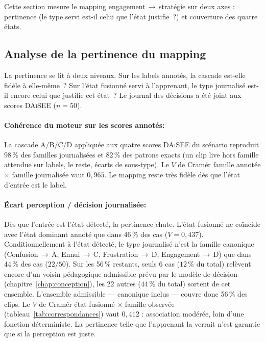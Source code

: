 Cette section mesure le mapping
engagement\,$\rightarrow$\,stratégie sur deux axes : pertinence (le type servi est-il celui que l'état justifie~?) et
couverture des quatre états.

\subsection{Analyse de la pertinence du mapping}
\label{subsec:val-correspondances}

La pertinence se lit à deux niveaux. Sur les labels annotés, la
cascade est-elle fidèle à elle-même~? Sur l'état fusionné servi
à l'apprenant, le type journalisé est-il encore celui que justifie cet
état~? Le journal des décisions a été joint aux scores
\textsc{DAiSEE} ($n=50$).

\paragraph{Cohérence du moteur sur les scores annotés:}
La cascade A/B/C/D appliquée aux quatre scores \textsc{DAiSEE} du
scénario reproduit 98\,\% des familles journalisées et
82\,\% des patrons exacts (un clip live hors famille attendue
sur labels, le reste, écarts de sous-type). Le $V$ de Cramér famille
annotée $\times$ famille journalisée vaut $0{,}965$. Le mapping reste
très fidèle dès que l'état d'entrée est le label.

\paragraph{Écart perception / décision journalisée:}
Dès que l'entrée est l'état détecté, la pertinence chute. L'état
fusionné ne coïncide avec l'état dominant annoté que dans
46\,\% des cas ($V=0{,}437$). Conditionnellement à l'état
détecté, le type journalisé n'est la famille canonique
(Confusion\,$\rightarrow$\,A, Ennui\,$\rightarrow$\,C,
Frustration\,$\rightarrow$\,D, Engagement\,$\rightarrow$\,D) que dans
44\,\% des cas ($22/50$). Sur les 56\,\%
restants, seuls 6 cas ($12\,\%$ du total) relèvent encore
d'un voisin pédagogique admissible prévu par le modèle de décision
(chapitre~\ref{chap:conception}), les 22
autres ($44\,\%$ du total) sortent de cet ensemble. L'ensemble
admissible --- canonique inclus --- couvre donc 56\,\% des
clips. Le $V$ de Cramér état fusionné $\times$ famille observée
(tableau~\ref{tab:correspondances}) vaut $0{,}412$ : association
modérée, loin d'une fonction déterministe. La pertinence telle que l'apprenant la verrait n'est garantie que si la
perception est juste.

